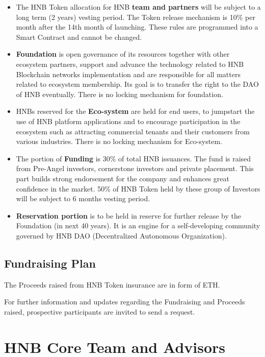 \documentclass[fleqn,10pt]{SelfArx} %
\begin{document}
\begin{itemize}
\item{The HNB Token allocation for HNB \textbf{team and partners} will be subject to a long term (2 years) vesting period. The Token release mechanism is 10\% per month after the 14th month of launching. These rules are programmed into a Smart Contract and cannot be changed.}
\item{\textbf{Foundation} is open governance of its resources together with other ecosystem partners, support and advance the technology related to HNB Blockchain networks implementation and are responsible for all matters related to ecosystem membership. Its goal is to transfer the right to the DAO of HNB eventually. There is no locking mechanism for foundation.}
\item{HNBs reserved for the \textbf{Eco-system} are held for end users, to jumpstart the use of HNB platform applications and to encourage participation in the ecosystem such as attracting commercial tenants and their customers from various industries. There is no locking mechanism for Eco-system.}
\item{The portion of \textbf{Funding} is 30\% of total HNB issuances. The fund is raised from Pre-Angel investors, cornerstone investors and private placement. This part builds strong endorsement for the company and enhances great confidence in the market. 50\% of HNB Token held by these group of Investors will be subject to 6 months vesting period. }
\item{\textbf{Reservation portion} is to be held in reserve for further release by the Foundation (in next 40 years). It is an engine for a self-developing community governed by HNB DAO (Decentralized Autonomous Organization). } \\ 

\end{itemize}
\subsection{Fundraising Plan}

The Proceeds raised from HNB Token insurance are in form of ETH.

For further information and updates regarding the Fundraising and Proceeds raised, prospective participants are invited to send a request.\\


\section{HNB Core Team and Advisors}
\end{document}

